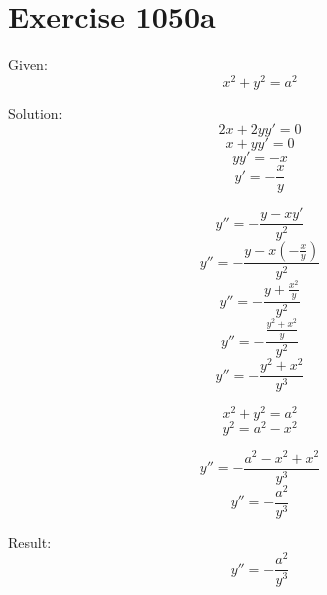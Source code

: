 \documentclass[a4paper, 10pt]{scrartcl}
\begin{document}
\section{Exercise 1050a}

Given:
\[
x^{2} + y^{2} = a^{2}
\]

Solution:
\[
2x + 2yy' = 0
\]
\[
x + yy' = 0
\]
\[
yy' = -x
\]
\[
y' = -\frac{x}{y}
\]

\[
y'' = -\frac{y - xy'}{y^{2}}
\]
\[
y'' = -\frac{y - x(-\frac{x}{y})}{y^{2}}
\]
\[
y'' = -\frac{y + \frac{x^{2}}{y}}{y^{2}}
\]
\[
y'' = -\frac{\frac{y^{2} + x^{2}}{y}}{y^{2}}
\]
\[
y'' = -\frac{y^{2} + x^{2}}{y^{3}}
\]

\[
x^{2} + y^{2} = a^{2}
\]
\[
y^{2} = a^{2} - x^{2}
\]

\[
y'' = -\frac{a^{2} - x^{2} + x^{2}}{y^{3}}
\]
\[
y'' = -\frac{a^{2}}{y^{3}}
\]

Result:
\[
y'' = -\frac{a^{2}}{y^{3}}
\]
\end{document}
